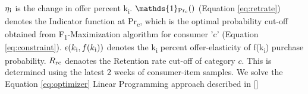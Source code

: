 $\eta\textsubscript{i}$ is the change in offer percent k\textsubscript{i}.
$ \mathds{1} \textsubscript{Pr\textsubscript{c}}()$ (Equation \ref{eq:retrate}) denotes the Indicator function 
at Pr\textsubscript{c}, which is the optimal probability cut-off obtained from F\textsubscript{1}-Maximization 
algorithm for consumer ’c’ (Equation \ref{eq:constraint}). $\epsilon(k\textsubscript{i},f(k\textsubscript{i}))$ 
denotes the k\textsubscript{i} percent offer-elasticity of f(k\textsubscript{i}) purchase probability.
$R\textsubscript{rc}$ denaotes the Retention rate cut-off of category $c$. This is determined using the latest
2 weeks of consumer-item samples. We solve the Equation \ref{eq:optimizer} Linear Programming approach
described in [\cite{ferreira2016analytics}] 

